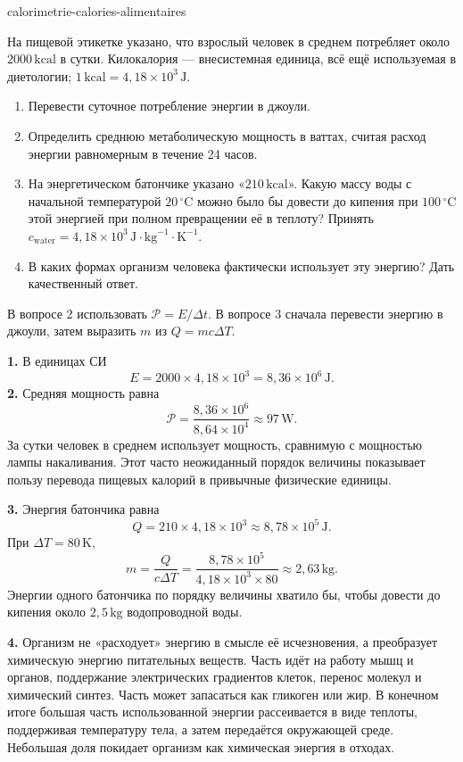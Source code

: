 \begin{exo}{calorimetrie-calories-alimentaires}

На пищевой этикетке указано, что взрослый человек в среднем потребляет около $2000\,\text{kcal}$ в сутки. Килокалория — внесистемная единица, всё ещё используемая в диетологии; $1\,\text{kcal}=4{,}18\times10^3\,\text{J}$.
\begin{enumerate}
  \item Перевести суточное потребление энергии в джоули.
  \item Определить среднюю метаболическую мощность в ваттах, считая расход энергии равномерным в течение 24 часов.
  \item На энергетическом батончике указано «$210\,\text{kcal}$». Какую массу воды с начальной температурой $20\,^\circ\text{C}$ можно было бы довести до кипения при $100\,^\circ\text{C}$ этой энергией при полном превращении её в теплоту? Принять $c_{\text{water}}=4{,}18\times10^3\,\text{J}\!\cdot\!\text{kg}^{-1}\!\cdot\!\text{K}^{-1}$.
  \item В каких формах организм человека фактически использует эту энергию? Дать качественный ответ.
\end{enumerate}
\begin{indication}
В вопросе 2 использовать $\mathcal P=E/\Delta t$. В вопросе 3 сначала перевести энергию в джоули, затем выразить $m$ из $Q=mc\Delta T$.
\end{indication}
\begin{solution}
\textbf{1.} В единицах СИ
\[
E=2000\times4{,}18\times10^3=8{,}36\times10^6\,\text{J}.
\]
\textbf{2.} Средняя мощность равна
\[
\mathcal P=\frac{8{,}36\times10^6}{8{,}64\times10^4}\approx97\,\text{W}.
\]
За сутки человек в среднем использует мощность, сравнимую с мощностью лампы накаливания. Этот часто неожиданный порядок величины показывает пользу перевода пищевых калорий в привычные физические единицы.

\textbf{3.} Энергия батончика равна
\[
Q=210\times4{,}18\times10^3\approx8{,}78\times10^5\,\text{J}.
\]
При $\Delta T=80\,\text{K}$,
\[
m=\frac{Q}{c\Delta T}
=\frac{8{,}78\times10^5}{4{,}18\times10^3\times80}
\approx2{,}63\,\text{kg}.
\]
Энергии одного батончика по порядку величины хватило бы, чтобы довести до кипения около $2{,}5\,\text{kg}$ водопроводной воды.

\textbf{4.} Организм не «расходует» энергию в смысле её исчезновения, а преобразует химическую энергию питательных веществ. Часть идёт на работу мышц и органов, поддержание электрических градиентов клеток, перенос молекул и химический синтез. Часть может запасаться как гликоген или жир. В конечном итоге большая часть использованной энергии рассеивается в виде теплоты, поддерживая температуру тела, а затем передаётся окружающей среде. Небольшая доля покидает организм как химическая энергия в отходах.
\end{solution}
\end{exo}
